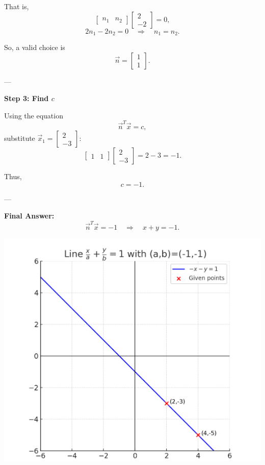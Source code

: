 \documentclass[journal]{IEEEtran}
\begin{document}
That is,
\[
\begin{bmatrix}n_1 & n_2\end{bmatrix}
\begin{bmatrix}2 \\ -2\end{bmatrix} = 0,
\]
\[
2n_1 - 2n_2 = 0 \quad \Rightarrow \quad n_1 = n_2.
\]

So, a valid choice is
\[
\vec{n} = \begin{bmatrix}1 \\ 1\end{bmatrix}.
\]

---

\textbf{Step 3: Find $c$}

Using the equation
\[
\vec{n}^T \vec{x} = c,
\]
substitute $\vec{x}_1 = \begin{bmatrix}2\\-3\end{bmatrix}$:
\[
\begin{bmatrix}1 & 1\end{bmatrix}\begin{bmatrix}2 \\ -3\end{bmatrix}
= 2 - 3 = -1.
\]

Thus,
\[
c = -1.
\]

---

\textbf{Final Answer:}
\[
\vec{n}^T \vec{x} = -1 \quad \Rightarrow \quad x+y=-1.
\]

\begin{center}
    \includegraphics[width=0.8\columnwidth]{figs/plot6.png}
\end{center}
\end{document}
